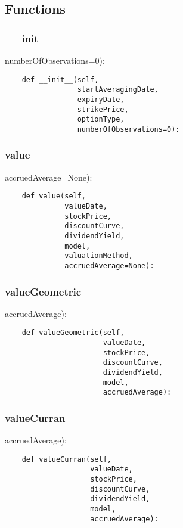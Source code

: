 \documentclass[twoside,11pt]{book}
\begin{document}
\subsection*{Functions}

\subsubsection*{{\bf \_\_init\_\_}}
numberOfObservations=0): 

\begin{lstlisting}
    def __init__(self,
                 startAveragingDate,
                 expiryDate,
                 strikePrice,
                 optionType,
                 numberOfObservations=0):
\end{lstlisting}

\subsubsection*{{\bf value}}
accruedAverage=None): 

\begin{lstlisting}
    def value(self,
              valueDate,
              stockPrice,
              discountCurve,
              dividendYield,
              model,
              valuationMethod,
              accruedAverage=None):
\end{lstlisting}

\subsubsection*{{\bf valueGeometric}}
accruedAverage): 

\begin{lstlisting}
    def valueGeometric(self,
                       valueDate,
                       stockPrice,
                       discountCurve,
                       dividendYield,
                       model,
                       accruedAverage):
\end{lstlisting}

\subsubsection*{{\bf valueCurran}}
accruedAverage): 

\begin{lstlisting}
    def valueCurran(self,
                    valueDate,
                    stockPrice,
                    discountCurve,
                    dividendYield,
                    model,
                    accruedAverage):
\end{lstlisting}
\end{document}
